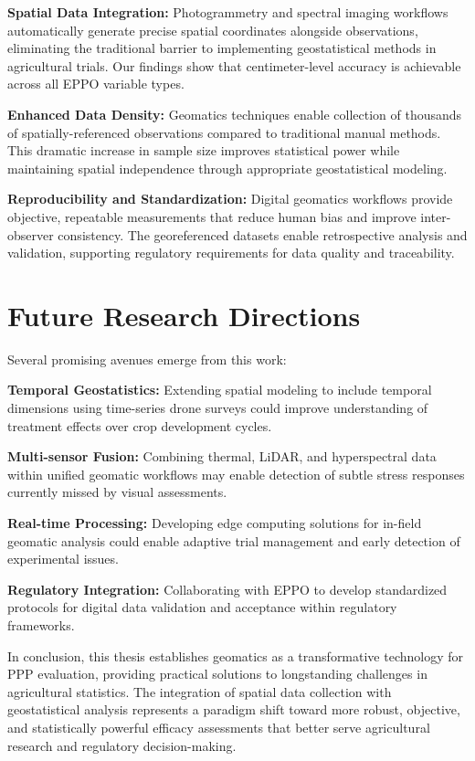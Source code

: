 \documentclass[12pt,a4paper,oneside]{report}
\begin{document}
\textbf{Spatial Data Integration:} Photogrammetry and spectral imaging workflows automatically generate precise spatial coordinates alongside observations, eliminating the traditional barrier to implementing geostatistical methods in agricultural trials. Our findings show that centimeter-level accuracy is achievable across all EPPO variable types.

\textbf{Enhanced Data Density:} Geomatics techniques enable collection of thousands of spatially-referenced observations compared to traditional manual methods. This dramatic increase in sample size improves statistical power while maintaining spatial independence through appropriate geostatistical modeling.

\textbf{Reproducibility and Standardization:} Digital geomatics workflows provide objective, repeatable measurements that reduce human bias and improve inter-observer consistency. The georeferenced datasets enable retrospective analysis and validation, supporting regulatory requirements for data quality and traceability.

\section{Future Research Directions}

Several promising avenues emerge from this work:

\textbf{Temporal Geostatistics:} Extending spatial modeling to include temporal dimensions using time-series drone surveys could improve understanding of treatment effects over crop development cycles.

\textbf{Multi-sensor Fusion:} Combining thermal, LiDAR, and hyperspectral data within unified geomatic workflows may enable detection of subtle stress responses currently missed by visual assessments.

\textbf{Real-time Processing:} Developing edge computing solutions for in-field geomatic analysis could enable adaptive trial management and early detection of experimental issues.

\textbf{Regulatory Integration:} Collaborating with EPPO to develop standardized protocols for digital data validation and acceptance within regulatory frameworks.

In conclusion, this thesis establishes geomatics as a transformative technology for PPP evaluation, providing practical solutions to longstanding challenges in agricultural statistics. The integration of spatial data collection with geostatistical analysis represents a paradigm shift toward more robust, objective, and statistically powerful efficacy assessments that better serve agricultural research and regulatory decision-making.


\end{document}
